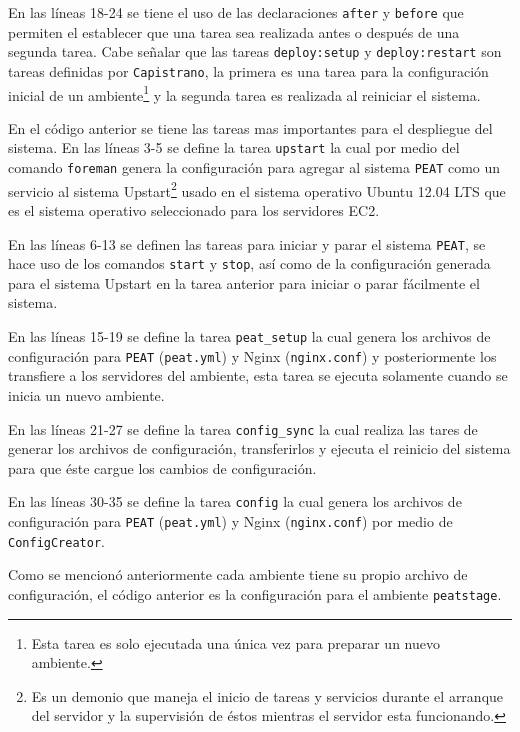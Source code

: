 En las líneas 18-24 se tiene el uso de las declaraciones \texttt{after}
y \texttt{before} que permiten el establecer que una tarea sea realizada
antes o después de una segunda tarea. Cabe señalar que las tareas
\texttt{deploy:setup} y \texttt{deploy:restart} son tareas definidas
por \texttt{Capistrano}, la primera es una tarea para la configuración inicial
de un ambiente\footnote{Esta tarea es solo ejecutada una única vez para preparar
  un nuevo ambiente.} y la segunda tarea es realizada al reiniciar el sistema.



En el código anterior se tiene las tareas mas importantes para el
despliegue del sistema. En las líneas 3-5 se define la tarea \texttt{upstart}
la cual por medio del comando \texttt{foreman} genera la configuración para agregar
al sistema \texttt{PEAT} como un servicio al sistema Upstart\footnote{Es un demonio
  que maneja el inicio de tareas y servicios durante el arranque del servidor y la
  supervisión de éstos mientras el servidor esta funcionando.} usado en el sistema
operativo Ubuntu 12.04 LTS que es el sistema operativo seleccionado para los
servidores EC2.

En las líneas 6-13 se definen las tareas para iniciar y parar el sistema
\texttt{PEAT}, se hace uso de los comandos \texttt{start} y \texttt{stop}, así como
de la configuración generada para el sistema Upstart en la tarea anterior para
iniciar o parar fácilmente el sistema.

En las líneas 15-19 se define la tarea \texttt{peat\_setup} la cual genera
los archivos de configuración para \texttt{PEAT} (\texttt{peat.yml}) y
Nginx (\texttt{nginx.conf}) y posteriormente los transfiere a los servidores
del ambiente, esta tarea se ejecuta solamente cuando se inicia un nuevo
ambiente.

En las líneas 21-27 se define la tarea \texttt{config\_sync} la cual
realiza las tares de generar los archivos de configuración, transferirlos y
ejecuta el reinicio del sistema para que éste cargue los cambios de configuración.

En las líneas 30-35 se define la tarea \texttt{config} la cual genera
los archivos de configuración para \texttt{PEAT} (\texttt{peat.yml}) y
Nginx (\texttt{nginx.conf}) por medio de \texttt{ConfigCreator}.



Como se mencionó anteriormente cada ambiente tiene su propio archivo de
configuración, el código anterior es la configuración para el ambiente
\texttt{peatstage}.

